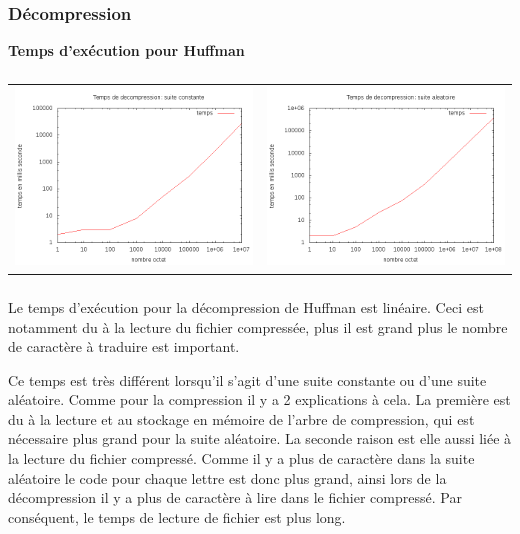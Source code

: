 \documentclass{report}
\begin{document}
\subsubsection*{Décompression}
\textbf{Temps d’exécution pour Huffman}
\subparagraph*{}
\hspace{-2cm}\begin{tabular}{l | l}
\includegraphics[width=7cm]{tempsDhC.png} & 
\includegraphics[width=7cm]{tempsDhA.png}
\end{tabular}
\subparagraph*{}
Le temps d'exécution pour la décompression de Huffman est linéaire. Ceci est notamment du à la lecture du fichier compressée, plus il est grand plus le nombre de caractère à traduire est important. 

Ce temps est très différent lorsqu’il s'agit d'une suite constante ou d'une suite aléatoire. Comme pour la compression il y a 2 explications à cela. La première est du à la lecture et au stockage en mémoire de l'arbre de compression, qui est nécessaire plus grand pour la suite aléatoire. La seconde raison est elle aussi liée à la lecture du fichier compressé. Comme il y a plus de caractère dans la suite aléatoire le code pour chaque lettre est donc plus grand, ainsi lors de la décompression il y a plus de caractère à lire dans le fichier compressé. Par conséquent, le temps de lecture de fichier est plus long.  
\end{document}
